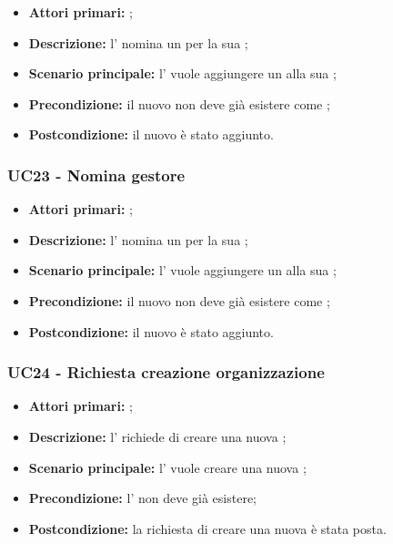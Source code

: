 \documentclass[../analisi-dei-requisiti]{subfiles}
\begin{document}
\begin{itemize}
\item \textbf{Attori primari:} ;
\item \textbf{Descrizione:} l'  nomina un  per la sua ;
\item \textbf{Scenario principale:} l'  vuole aggiungere un  alla sua ;
\item \textbf{Precondizione:} il nuovo  non deve già esistere come ;
\item \textbf{Postcondizione:} il nuovo  è stato aggiunto.

\end{itemize}


\subsubsection{UC23 - Nomina gestore}
\label{subsub:UC23}

\begin{itemize}
\item \textbf{Attori primari:} ;
\item \textbf{Descrizione:} l'  nomina un  per la sua ;
\item \textbf{Scenario principale:} l'  vuole aggiungere un  alla sua ;
\item \textbf{Precondizione:} il nuovo  non deve già esistere come ;
\item \textbf{Postcondizione:} il nuovo  è stato aggiunto.

\end{itemize}


\subsubsection{UC24 - Richiesta creazione organizzazione}
\label{subsub:UC24}

\begin{itemize}
\item \textbf{Attori primari:} ;
\item \textbf{Descrizione:} l'  richiede di creare una nuova ;
\item \textbf{Scenario principale:} l'  vuole creare una nuova ;
\item \textbf{Precondizione:} l'  non deve già esistere;
\item \textbf{Postcondizione:} la richiesta di creare una nuova  è stata posta.

\end{itemize}
\end{document}
